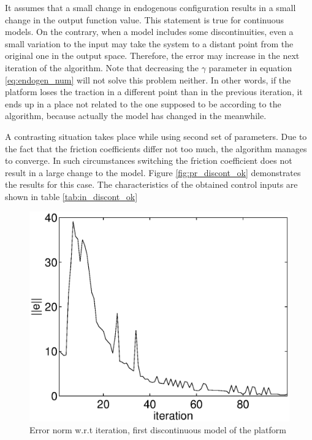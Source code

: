 It assumes that a small change in endogenous configuration results in a small change
in the output function value. This statement is true for continuous models. On the contrary,
when a model includes some discontinuities, even a small variation to the input may take
the system to a distant point from the original one in the output space. Therefore, the
error may increase in the next iteration of the algorithm. Note that decreasing
the $\gamma$ parameter in equation \eqref{eq:endogen_num} will not solve this problem neither.
In other words, if the platform loses the traction in a different point than in
the previous iteration, it ends up in a place not related to the one supposed to be
according to the algorithm, because actually the model has changed in the meanwhile.

A contrasting situation takes place while using second set of parameters. Due to the fact
that the friction coefficients differ not too much, the algorithm manages to converge.
In such circumstances switching the friction coefficient does not result in a large change to the model.
Figure \ref{fig:pr_discont_ok} demonstrates the results for this case. The characteristics
of the obtained control inputs are shown in table \ref{tab:in_discont_ok}

\begin{figure}[htp]
\centering
\includegraphics[height=0.3\textheight]{img/discont_err.eps}
\caption{Error norm w.r.t iteration, first discontinuous model of the platform}
\label{fig:error_discont}
\end{figure}

